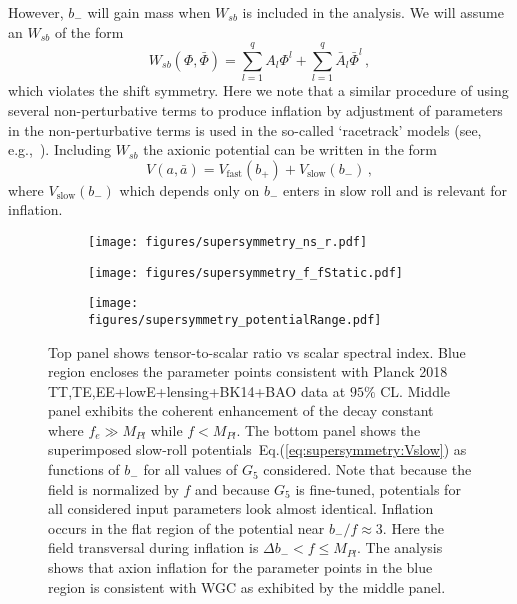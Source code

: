 \documentclass[12pt]{article}
\begin{document}
However, $b_-$ will gain mass when $W_{sb}$ is included in the analysis.
We will assume an $W_{sb}$ of the form
\begin{equation} \label{eq:supersymmetry:Wsb}
  W_{sb}\left(\Phi, \bar\Phi\right) =
      \sum_{l = 1}^q A_l \Phi^l
    + \sum_{l = 1}^q \bar A_l \bar\Phi^l\,,
\end{equation}
which violates the shift symmetry.
Here we note that a similar procedure of using several non-perturbative terms to produce inflation by adjustment of parameters in the non-perturbative terms is used in the so-called `racetrack' models (see, e.g.,~\cite{BlancoPillado:2004ns, Lalak:2005hr, Greene:2005rn, BlancoPillado:2006he}).
Including $W_{sb}$ the axionic potential can be written in the form
\begin{equation}
  V\left(a, \bar a\right) = V_\text{fast}\left(b_+\right) + V_\text{slow}\left(b_-\right)\,,
\end{equation}
where $V_\text{slow}\left(b_-\right)$ which depends only on $b_-$ enters in slow roll and is relevant for inflation.

\begin{figure}
  \centering
  \begin{subfigure}{0.5 \textwidth}
    \texttt{[image: figures/supersymmetry\_ns\_r.pdf]}
  \end{subfigure}
  \begin{subfigure}{0.5 \textwidth}
    \texttt{[image: figures/supersymmetry\_f\_fStatic.pdf]}
  \end{subfigure}
  \begin{subfigure}{0.5 \textwidth}
    \texttt{[image: figures/supersymmetry\_potentialRange.pdf]}
  \end{subfigure}
  \caption{\protect
    Top panel shows tensor-to-scalar ratio vs scalar spectral index.
    Blue region encloses the parameter points consistent with Planck 2018 TT,TE,EE+lowE+lensing+BK14+BAO data at $95\%$ CL.
    Middle panel exhibits the coherent enhancement of the decay constant where $f_e \gg M_{Pl}$ while $f < M_{Pl}$.
    The bottom panel shows the superimposed slow-roll potentials~Eq.(\ref{eq:supersymmetry:Vslow}) as functions of $b_-$ for all values of $G_5$ considered.
    Note that because the field is normalized by $f$ and because $G_5$ is fine-tuned, potentials for all considered input parameters look almost identical.
    Inflation occurs in the flat region of the potential near $b_- / f \approx 3$.
    Here the field transversal during inflation is $\Delta b_- < f \le M_{Pl}$.
    The analysis shows that axion inflation for the parameter points in the blue region is consistent with WGC as exhibited by the middle panel.
  } \label{fig:supersymmetry}
\end{figure}
\end{document}

